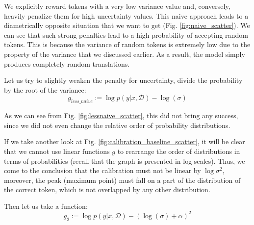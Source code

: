 \documentclass[a4paper,14pt]{extarticle}
\begin{document}
	We explicitly reward tokens with a very low variance value and, conversely, heavily penalize them for high uncertainty values. This naive approach leads to a diametrically opposite situation that we want to get (Fig. \ref{fig:naive_scatter}). We can see that such strong penalties lead to a high probability of accepting random tokens. This is because the variance of random tokens is extremely low due to the property of the variance that we discussed earlier. As a result, the model simply produces completely random translations.

	
	Let us try to slightly weaken the penalty for uncertainty, divide the probability by the root of the variance:
	\begin{equation}
		g_{less\_naive} := \log p(y | x, \mathcal{D}) - \log(\sigma)
	\end{equation}
	
	As we can see from Fig. \ref{fig:lessnaive_scatter}, this did not bring any success, since we did not even change the relative order of probability distributions.

	If we take another look at Fig. \ref{fig:calibration_baseline_scatter}, it will be clear that we cannot use linear functions $g$ to rearrange the order of distributions in terms of probabilities (recall that the graph is presented in log scales). Thus, we come to the conclusion that the calibration must not be linear by $\log \sigma^2$, moreover, the peak (maximum point) must fall on a part of the distribution of the correct token, which is not overlapped by any other distribution.

	Then let us take a function:
	\begin{equation}
		g_{2} := \log p(y | x, \mathcal{D}) - (\log(\sigma) + \alpha)^2
	\end{equation}
	
\end{document}
